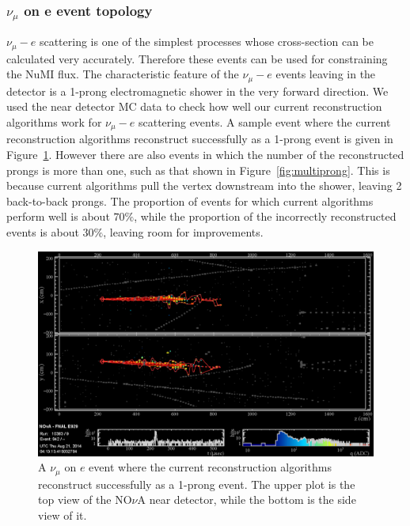 \documentclass[12pt,a4paper,final]{iopart}
\begin{document}
\subsubsection[Numu on e Event Topology]{$\nu_\mu$ on e event topology}

$\nu_\mu-e$ scattering is one of the simplest processes whose cross-section can be calculated very accurately. Therefore these events can be used for constraining the NuMI flux. The characteristic feature of the $\nu_\mu-e$ events leaving in the detector is a 1-prong electromagnetic shower in the very forward direction.  We used the near detector MC data to check how well our current reconstruction algorithms work for $\nu_\mu-e$ scattering events. A sample event where the current reconstruction algorithms reconstruct successfully as a 1-prong event is given in Figure~\ref{fig:oneprong}. However there are also events in which the number of the reconstructed prongs is more than one, such as that shown in Figure~\ref{fig:multiprong}. This is because current algorithms pull the vertex downstream into the shower, leaving 2 back-to-back prongs. The proportion of events for which current algorithms perform well is about $70\%$, while the proportion of the incorrectly reconstructed events is about $30\%$, leaving room for improvements.

\begin{figure}
  \centering
  \includegraphics[width=\textwidth]{figures/2015/nelastic1npng3d1.eps}
  \caption{A $\nu_\mu$ on $e$ event where the current reconstruction algorithms reconstruct successfully as a 1-prong event. The upper plot is the top view of the NO$\nu$A near detector, while the bottom is the side view of it.}
  \label{fig:oneprong}
\end{figure}
\end{document}
